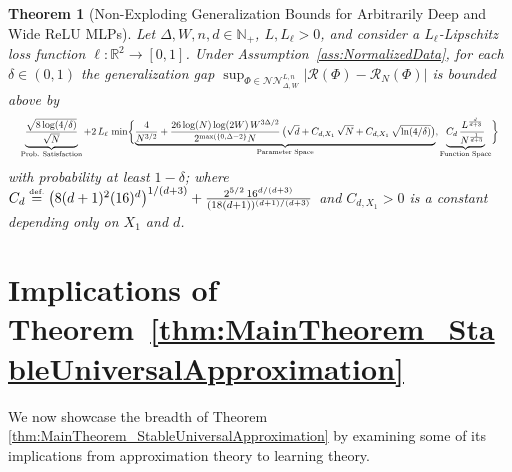 \documentclass{article}
\numberwithin{equation}{section}
\newtheorem{theorem}{Theorem}[section]
\theoremstyle{definition}
\newcommand{\eqdef}{\ensuremath{\stackrel{\mbox{\upshape\tiny def.}}{=}}}
\begin{document}
\begin{theorem}[Non-Exploding Generalization Bounds for Arbitrarily Deep and Wide ReLU MLPs]
\label{thm:RademacherBound}
Let $\Delta,W,n,d\in \mathbb{N}_+$, $L,L_{\ell}>0$, and consider a $L_{\ell}$-Lipschitz loss function $\ell:\mathbb{R}^2\to [0,1]$.
Under Assumption~\ref{ass:NormalizedData}, for each $\delta \in (0,1)$ the generalization gap $\sup_{\Phi\in \mathcal{NN}_{\Delta,W}^{L,n}} \big|\mathcal{R}(\Phi)-\mathcal{R}_N(\Phi)\big|$ is bounded above by
\begin{equation*}
\resizebox{.99\hsize}{!}{$%
\begin{aligned}
    \underbrace{
        \frac{
            \sqrt{8\log(4/\delta)}
        }{
            \sqrt{N}
        }
    }_{\text{Prob. Satisfaction}}
    +
    2\,L_{\ell}\,
    \min\biggl\{
            \underbrace{
             \frac{4}{N^{3/2}}
                        +
                        \frac{
                            26\log(N)\log(2W)
                            \,
                            W^{3\Delta/2}
                        }{
                            2^{\max(\{0,\Delta-2\}}
                            N
                        }
                        \,
                        \big(
                            \sqrt{d}
                            +
                            C_{d,X_1}\,\sqrt{N}
                            +
                            C_{d,X_1}\,\sqrt{\ln(4/\delta)}
                        \big)
            }_{\text{Parameter Space}}
    ,
            \underbrace{
                C_d\,\frac{L^{\frac{d}{d+3}}}{N^{\frac{1}{d+3}}}
            }_{\text{Function Space}}
    \biggr\}
\end{aligned}
$}%
\end{equation*}
with probability at least $1-\delta$; where $C_d\eqdef \big(8(d+1)^2 (16)^d\big)^{1/(d+3)} + \frac{2^{5/2}\,16^{d/(d+3)}}{(18(d+1))^{(d+1)/(d+3)}}$ and $C_{d,X_1}>0$ is a constant depending only on $X_1$ and $d$.
\end{theorem}








\section{{Implications of Theorem~\ref{thm:MainTheorem_StableUniversalApproximation}}}
\label{s:Consequences}
We now showcase the breadth of Theorem \ref{thm:MainTheorem_StableUniversalApproximation} by examining some of its implications from approximation theory to learning theory.  
\end{document}
